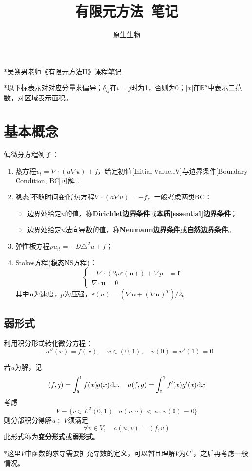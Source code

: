 \documentclass[a4paper,UTF8,fontset=windows]{ctexart}
\title{\textbf{有限元方法\ 笔记}}
\author{原生生物}
\date{}
\newcommand*{\dr}{\hspace{0.07em}\mathrm{d}}
\newcommand*{\bu}{\mathbf{u}}
\renewcommand*{\bf}{\mathbf{f}}
\begin{document}
\maketitle

*吴朔男老师《有限元方法II》课程笔记

*以下标表示对对应分量求偏导；$\delta_{ij}$在$i=j$时为1，否则为0；$|x|$在$\mathbb{R}^n$中表示二范数，对区域表示面积。

\tableofcontents

\newpage
\section{基本概念}
偏微分方程例子：
\begin{enumerate}
    \item 热方程$u_t=\nabla\cdot(a\nabla u)+f$，给定初值[Initial Value,IV]与边界条件[Boundary Condition, BC]可解；
    \item 稳态[不随时间变化]热方程$\nabla\cdot(a\nabla u)=-f$，一般考虑两类BC：
    \begin{itemize}
        \item 边界处给定$u$的值，称\textbf{Dirichlet边界条件}或\textbf{本质[essential]边界条件}；
        \item 边界处给定$u$法向导数的值，称\textbf{Neumann边界条件}或\textbf{自然边界条件}。
    \end{itemize}
    \item 弹性板方程$\rho u_{tt}=-D\triangle^2u+f$；
    \item Stokes方程(稳态NS方程)：
    $$\begin{cases}-\nabla\cdot(2\mu\varepsilon(\bu))+\nabla p&=\bf\\\nabla\cdot\bu=0\end{cases}$$
    其中$\bu$为速度，$p$为压强，$\varepsilon(u)=(\nabla\bu+(\nabla\bu)^T)/2$。
\end{enumerate}

\subsection{弱形式}
利用积分形式转化微分方程：
$$-u''(x)=f(x),\quad x\in(0,1),\quad u(0)=u'(1)=0$$

若$u$为解，记
$$(f,g)=\int_0^1f(x)g(x)\dr x,\quad a(f,g)=\int_0^1f'(x)g'(x)\dr x$$
考虑
$$V=\{v\in L^2(0,1)\mid a(v,v)<\infty,v(0)=0\}$$
则分部积分得解$u\in V$须满足
$$\forall v\in V,\quad a(u,v)=(f,v)$$
此形式称为\textbf{变分形式}或\textbf{弱形式}。

*这里$V$中函数的求导需要扩充导数的定义，可以暂且理解$V$为$C^1$，之后再考虑一般情况。
\end{document}
